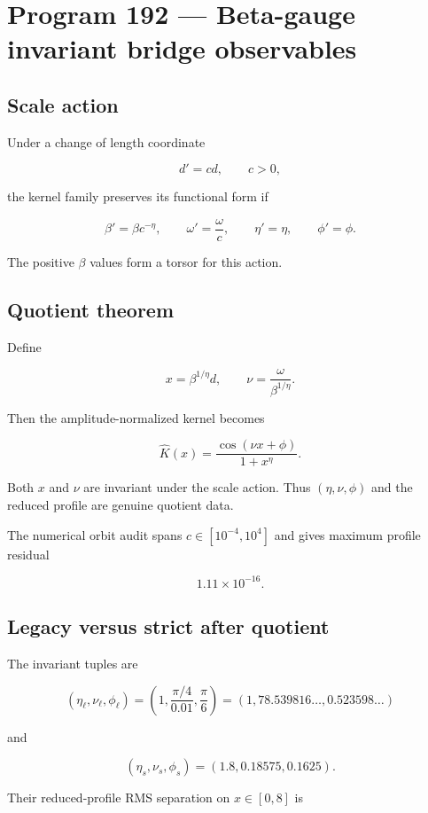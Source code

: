 \documentclass[11pt,a4paper,openany]{report}
\begin{document}
\chapter{Program 192 --- Beta-gauge invariant bridge observables}

\section{Scale action}

Under a change of length coordinate

\[
d'=cd,
\qquad c>0,
\]

the kernel family preserves its functional form if

\[
\beta'=\beta c^{-\eta},
\qquad
\omega'=\frac{\omega}{c},
\qquad
\eta'=\eta,
\qquad
\phi'=\phi.
\]

The positive \(\beta\) values form a torsor for this action.

\section{Quotient theorem}

Define

\[
x=\beta^{1/\eta}d,
\qquad
\nu=\frac{\omega}{\beta^{1/\eta}}.
\]

Then the amplitude-normalized kernel becomes

\[
\widehat K(x)
=
\frac{\cos(\nu x+\phi)}
{1+x^\eta}.
\]

Both \(x\) and \(\nu\) are invariant under the scale action. Thus \((\eta,\nu,\phi)\) and the reduced profile are genuine quotient data.

The numerical orbit audit spans \(c\in[10^{-4},10^4]\) and gives maximum profile residual

\[
1.11\times10^{-16}.
\]

\section{Legacy versus strict after quotient}

The invariant tuples are

\[
(\eta_\ell,\nu_\ell,\phi_\ell)
=
\left(
1,
\frac{\pi/4}{0.01},
\frac{\pi}{6}
\right)
=
(1,78.539816\ldots,0.523598\ldots)
\]

and

\[
(\eta_s,\nu_s,\phi_s)
=(1.8,0.18575,0.1625).
\]

Their reduced-profile RMS separation on \(x\in[0,8]\) is
\end{document}
